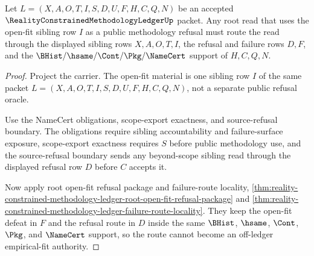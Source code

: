 \begin{theorem}
\label{thm:reality-constrained-methodology-ledger-root-open-fit-refusal-route}
Let $L=(X,A,O,T,I,S,D,U,F,H,C,Q,N)$ be an accepted
$\RealityConstrainedMethodologyLedgerUp$ packet. Any root read that uses the
open-fit sibling row $I$ as a public methodology refusal must route the read
through the displayed sibling rows $X,A,O,T,I$, the refusal and failure rows
$D,F$, and the $\BHist/\hsame/\Cont/\Pkg/\NameCert$ support of $H,C,Q,N$.
\end{theorem}
\begin{proof}
Project the carrier. The open-fit material is one sibling row $I$ of the same
packet $L=(X,A,O,T,I,S,D,U,F,H,C,Q,N)$, not a separate public refusal oracle.

Use the NameCert obligations, scope-export exactness, and source-refusal
boundary. The obligations require sibling accountability and failure-surface
exposure, scope-export exactness requires $S$ before public methodology use, and
the source-refusal boundary sends any beyond-scope sibling read through the
displayed refusal row $D$ before $C$ accepts it.

Now apply root open-fit refusal package and failure-route locality,
\autoref{thm:reality-constrained-methodology-ledger-root-open-fit-refusal-package}
and
\autoref{thm:reality-constrained-methodology-ledger-failure-route-locality}.
They keep the open-fit defeat in $F$ and the refusal route in $D$ inside the
same $\BHist$, $\hsame$, $\Cont$, $\Pkg$, and $\NameCert$ support, so the route
cannot become an off-ledger empirical-fit authority.
\end{proof}

